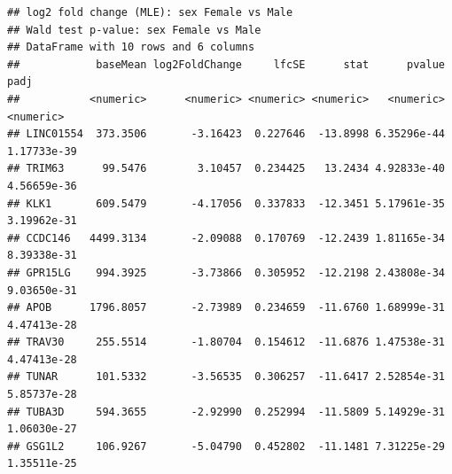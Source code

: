 \documentclass[
]{article}
\newenvironment{Shaded}{\begin{snugshade}}{\end{snugshade}}
\newcommand{\AttributeTok}[1]{\textcolor[rgb]{0.13,0.29,0.53}{#1}}
\newcommand{\CommentTok}[1]{\textcolor[rgb]{0.56,0.35,0.01}{\textit{#1}}}
\newcommand{\ConstantTok}[1]{\textcolor[rgb]{0.56,0.35,0.01}{#1}}
\newcommand{\DecValTok}[1]{\textcolor[rgb]{0.00,0.00,0.81}{#1}}
\newcommand{\FloatTok}[1]{\textcolor[rgb]{0.00,0.00,0.81}{#1}}
\newcommand{\FunctionTok}[1]{\textcolor[rgb]{0.13,0.29,0.53}{\textbf{#1}}}
\newcommand{\NormalTok}[1]{#1}
\newcommand{\OtherTok}[1]{\textcolor[rgb]{0.56,0.35,0.01}{#1}}
\newcommand{\SpecialCharTok}[1]{\textcolor[rgb]{0.81,0.36,0.00}{\textbf{#1}}}
\begin{document}
\begin{verbatim}
## log2 fold change (MLE): sex Female vs Male 
## Wald test p-value: sex Female vs Male 
## DataFrame with 10 rows and 6 columns
##            baseMean log2FoldChange     lfcSE      stat      pvalue        padj
##           <numeric>      <numeric> <numeric> <numeric>   <numeric>   <numeric>
## LINC01554  373.3506       -3.16423  0.227646  -13.8998 6.35296e-44 1.17733e-39
## TRIM63      99.5476        3.10457  0.234425   13.2434 4.92833e-40 4.56659e-36
## KLK1       609.5479       -4.17056  0.337833  -12.3451 5.17961e-35 3.19962e-31
## CCDC146   4499.3134       -2.09088  0.170769  -12.2439 1.81165e-34 8.39338e-31
## GPR15LG    994.3925       -3.73866  0.305952  -12.2198 2.43808e-34 9.03650e-31
## APOB      1796.8057       -2.73989  0.234659  -11.6760 1.68999e-31 4.47413e-28
## TRAV30     255.5514       -1.80704  0.154612  -11.6876 1.47538e-31 4.47413e-28
## TUNAR      101.5332       -3.56535  0.306257  -11.6417 2.52854e-31 5.85737e-28
## TUBA3D     594.3655       -2.92990  0.252994  -11.5809 5.14929e-31 1.06030e-27
## GSG1L2     106.9267       -5.04790  0.452802  -11.1481 7.31225e-29 1.35511e-25
\end{verbatim}

\begin{Shaded}
\end{Shaded}
\end{document}

